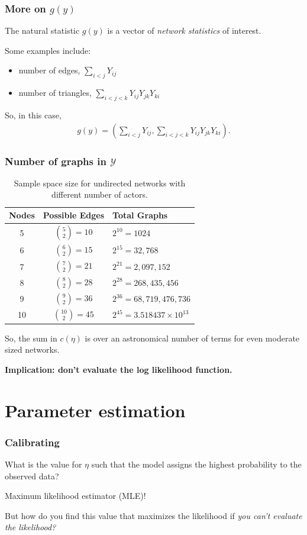 \documentclass[ 10pt]{beamer}
\def\YY{{\mathcal Y}}
\begin{document}
\frame
{
\frametitle{More on $g(y)$}
The natural statistic $g(y)$ is a vector of \emph{network statistics} of interest.  
\vspace{2mm}

Some examples include:
\begin{itemize}
	\item number of edges, $\sum_{i<j} Y_{ij}$
	\item number of triangles, $\sum_{i < j < k} Y_{ij}Y_{jk}Y_{ki}$
\end{itemize}
\vspace{2mm}

So, in this case,
\begin{align*}
	g(y) = \left( \sum_{i<j} Y_{ij}, 
					\sum_{i < j < k} Y_{ij}Y_{jk}Y_{ki} \right ).
\end{align*}
}


\frame
{
\frametitle{Number of graphs in $\YY$}
\begin{table}[h] 
\caption{Sample space size for undirected networks with different number of 
actors.}

\begin{tabular}{ccl} 
\hline 
Nodes & Possible Edges & Total Graphs \\ [1ex]
\hline
5 & ${5 \choose 2} = 10$ & $2^{10} = 1024$ \\ [1ex]
6 & ${6 \choose 2} = 15$ & $2^{15} = 32,768$ \\ [1ex]
7 & ${7 \choose 2} = 21$ & $2^{21} = 2,097,152$ \\ [1ex]
8 & ${8 \choose 2} = 28$ & $2^{28} = 268,435,456$ \\ [1ex]
9 & ${9 \choose 2} = 36$ & $2^{36} = 68,719,476,736$ \\ [1ex]
10 & ${10 \choose 2} = 45$ & $2^{45} = 3.518437\times10^{13}$ \\ [1ex]
\hline 
\end{tabular} \label{T:number graphs}
\end{table}
\pause

So, the sum in $c(\eta)$ is over an astronomical number of terms for 
even moderate sized networks.
\vspace{2mm}

\textbf{Implication: don't evaluate the log likelihood function.}
}

\section{Parameter estimation}
\frame
{
\frametitle{Calibrating}
What is the value for $\eta$ such that the model assigns the highest probability to the observed data?
\vspace{2mm}

Maximum likelihood estimator (MLE)!
\vspace{5mm}

But how do you find this value that maximizes the likelihood if \emph{you can't evaluate the likelihood?}
}
\end{document}
